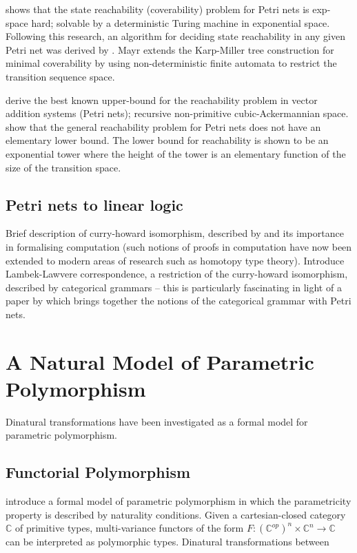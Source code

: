 \documentclass[11pt,openright,hidelinks,a4paper]{article}
\begin{document}
 shows that the state reachability (coverability) problem for Petri nets is exp-space hard; solvable by a deterministic Turing machine in exponential space. Following this research, an algorithm for deciding state reachability in any given Petri net was derived by . Mayr extends the Karp-Miller tree construction for minimal coverability by using non-deterministic finite automata to restrict the transition sequence space.

 derive the best known upper-bound for the reachability problem in vector addition systems (Petri nets); recursive non-primitive cubic-Ackermannian space.  show that the general reachability problem for Petri nets does not have an elementary lower bound. The lower bound for reachability is shown to be an exponential tower where the height of the tower is an elementary function of the size of the transition space.

\subsection{Petri nets to linear logic}
Brief description of curry-howard isomorphism, described by  and its importance in formalising computation (such notions of proofs in computation have now been extended to modern areas of research such as homotopy type theory).
\newline\newline
Introduce Lambek-Lawvere correspondence, a restriction of the curry-howard isomorphism, described by categorical grammars -- this is particularly fascinating in light of a paper by  which brings together the notions of the categorical grammar with Petri nets.

\section{A Natural Model of Parametric Polymorphism}
Dinatural transformations have been investigated as a formal model for parametric polymorphism.

\subsection{Functorial Polymorphism}
 introduce a formal model of parametric polymorphism in which the parametricity property is described by naturality conditions. Given a cartesian-closed category $\mathbb{C}$ of primitive types, multi-variance functors of the form $F : (\mathbb{C}^{op})^n \times \mathbb{C}^n \rightarrow \mathbb{C}$ can be interpreted as polymorphic types. Dinatural transformations between
\end{document}

